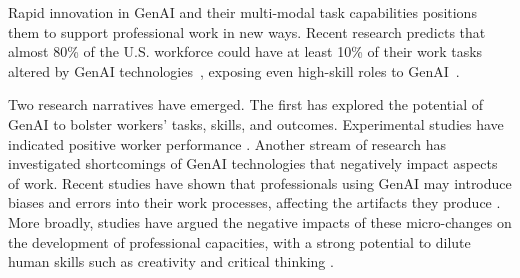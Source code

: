 

Rapid innovation in GenAI and their multi-modal task capabilities positions them to support professional work in new ways.
Recent research predicts that almost 80\% of the U.S. workforce could have at least 10\% of their work tasks altered by GenAI technologies~\cite{Eloundou_2023}, exposing even high-skill roles to GenAI~\cite{Felten2023}.    

Two research narratives have emerged. The first has explored the potential of GenAI to bolster workers' tasks, skills, and outcomes. Experimental studies have indicated positive worker performance \cite{Al2024,Brynjolfsson2023}. 
Another stream of research has investigated shortcomings of GenAI technologies that negatively impact aspects of work. Recent studies have shown that professionals using GenAI may introduce biases and errors into their work processes, affecting the artifacts they produce %
\cite{Kidd_Birhane_2023}. More broadly, studies have argued the negative impacts of these micro-changes on the development of professional capacities, with a strong potential to dilute human skills such as creativity and critical thinking \cite{Walczak_2023}. 

